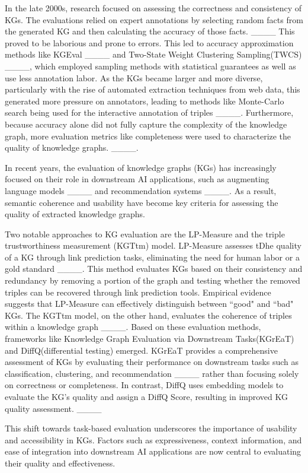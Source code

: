 In the late 2000s, research focused on assessing the correctness and consistency of KGs. The evaluations relied on expert annotations by selecting random facts from the generated KG and then calculating the accuracy of those facts. ____ This proved to be laborious and prone to errors. This led to accuracy approximation methods like KGEval ____ and Two-State Weight Clustering Sampling(TWCS) ____, which employed sampling methods with statistical guarantees as well as use less annotation labor. As the KGs became larger and more diverse, particularly with the rise of automated extraction techniques from web data, this generated more pressure on annotators, leading to methods like Monte-Carlo search being used for the interactive annotation of triples ____. Furthermore, because accuracy alone did not fully capture the complexity of the knowledge graph, more evaluation metrics like completeness were used to characterize the quality of knowledge graphs. ____. 


In recent years, the evaluation of knowledge graphs (KGs) has increasingly focused on their role in downstream AI applications, such as augmenting language models ____ and recommendation systems ____. As a result, semantic coherence and usability have become key criteria for assessing the quality of extracted knowledge graphs.

Two notable approaches to KG evaluation are the LP-Measure and the triple trustworthiness measurement (KGTtm) model. LP-Measure assesses tDhe quality of a KG through link prediction tasks, eliminating the need for human labor or a gold standard ____. This method evaluates KGs based on their consistency and redundancy by removing a portion of the graph and testing whether the removed triples can be recovered through link prediction tools. Empirical evidence suggests that LP-Measure can effectively distinguish between ``good" and ``bad" KGs. The KGTtm model, on the other hand, evaluates the coherence of triples within a knowledge graph ____. Based on these evaluation methods, frameworks like Knowledge Graph Evaluation via Downstream Tasks(KGrEaT) and DiffQ(differential testing) emerged. KGrEaT provides a comprehensive assessment of KGs by evaluating their performance on downstream tasks such as classification, clustering, and recommendation ____ rather than focusing solely on correctness or completeness. In contrast, DiffQ uses embedding models to evaluate the KG's quality and assign a DiffQ Score, resulting in improved KG quality assessment. ____ 

This shift towards task-based evaluation underscores the importance of usability and accessibility in KGs. Factors such as expressiveness, context information, and ease of integration into downstream AI applications are now central to evaluating their quality and effectiveness.